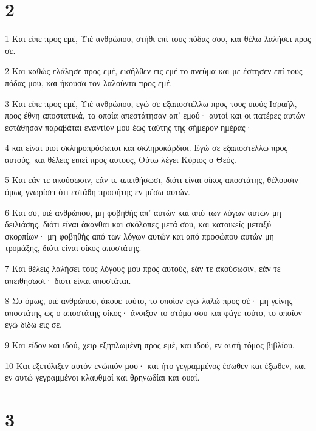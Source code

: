 \chapter{2}

\par 1 Και είπε προς εμέ, Υιέ ανθρώπου, στήθι επί τους πόδας σου, και θέλω λαλήσει προς σε.
\par 2 Και καθώς ελάλησε προς εμέ, εισήλθεν εις εμέ το πνεύμα και με έστησεν επί τους πόδας μου, και ήκουσα τον λαλούντα προς εμέ.
\par 3 Και είπε προς εμέ, Υιέ ανθρώπου, εγώ σε εξαποστέλλω προς τους υιούς Ισραήλ, προς έθνη αποστατικά, τα οποία απεστάτησαν απ' εμού· αυτοί και οι πατέρες αυτών εστάθησαν παραβάται εναντίον μου έως ταύτης της σήμερον ημέρας·
\par 4 και είναι υιοί σκληροπρόσωποι και σκληροκάρδιοι. Εγώ σε εξαποστέλλω προς αυτούς, και θέλεις ειπεί προς αυτούς, Ούτω λέγει Κύριος ο Θεός.
\par 5 Και εάν τε ακούσωσιν, εάν τε απειθήσωσι, διότι είναι οίκος αποστάτης, θέλουσιν όμως γνωρίσει ότι εστάθη προφήτης εν μέσω αυτών.
\par 6 Και συ, υιέ ανθρώπου, μη φοβηθής απ' αυτών και από των λόγων αυτών μη δειλιάσης, διότι είναι άκανθαι και σκόλοπες μετά σου, και κατοικείς μεταξύ σκορπίων· μη φοβηθής από των λόγων αυτών και από προσώπου αυτών μη τρομάξης, διότι είναι οίκος αποστάτης.
\par 7 Και θέλεις λαλήσει τους λόγους μου προς αυτούς, εάν τε ακούσωσιν, εάν τε απειθήσωσι· διότι είναι αποστάται.
\par 8 Συ όμως, υιέ ανθρώπου, άκουε τούτο, το οποίον εγώ λαλώ προς σέ· μη γείνης αποστάτης ως ο αποστάτης οίκος· άνοιξον το στόμα σου και φάγε τούτο, το οποίον εγώ δίδω εις σε.
\par 9 Και είδον και ιδού, χειρ εξηπλωμένη προς εμέ, και ιδού, εν αυτή τόμος βιβλίου.
\par 10 Και εξετύλιξεν αυτόν ενώπιόν μου· και ήτο γεγραμμένος έσωθεν και έξωθεν, και εν αυτώ γεγραμμένοι κλαυθμοί και θρηνωδίαι και ουαί.

\chapter{3}

